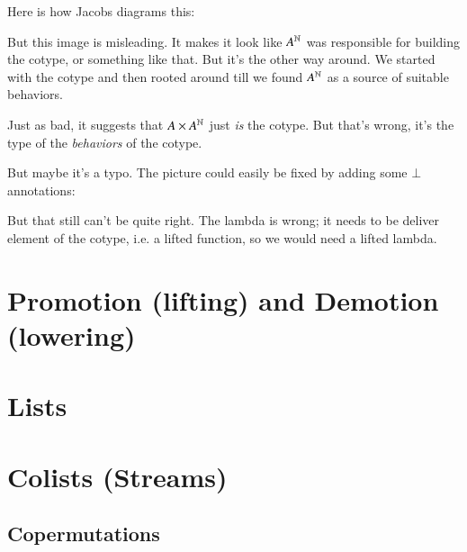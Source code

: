 Here is how Jacobs diagrams this:

\vspace{2ex}

%

But this image is misleading. It makes it look like \(A^{\mathbb{N}}\) was
responsible for building the cotype, or something like that. But it's
the other way around. We started with the cotype and then rooted
around till we found \(A^{\mathbb{N}}\) as a source of suitable behaviors.

Just as bad, it suggests that \(A\times{}A^{\mathbb{N}}\) just \textit{is}
the cotype. But that's wrong, it's the type of the \textit{behaviors}
of the cotype.

But maybe it's a typo. The picture could easily be fixed by adding some \(\bot\) annotations:

%

But that still can't be quite right. The lambda is wrong; it needs to
be deliver element of the cotype, i.e. a lifted function, so we would need
a lifted lambda.

\section{Promotion (lifting) and Demotion (lowering)}

\section{Lists}

\section{Colists (Streams)}

\subsection{Copermutations}

